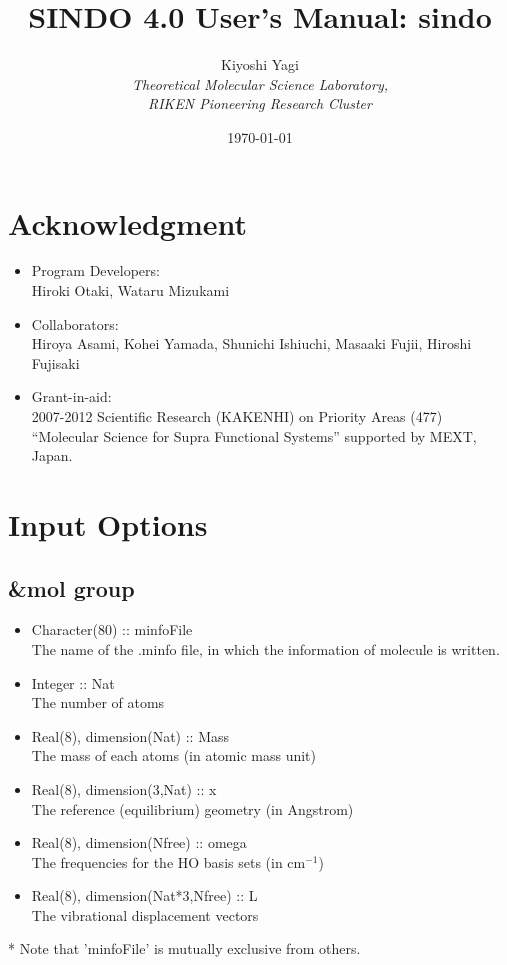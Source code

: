 \documentclass[a4paper,12pt]{article}
\title{{\huge S{\LARGE INDO} 4.0 User's Manual: sindo} }
\author{Kiyoshi Yagi \\ {\it Theoretical Molecular Science Laboratory,} \\ {\it RIKEN Pioneering Research Cluster}}
\date{\today}
\begin{document}
\maketitle

\newpage
\tableofcontents

\newpage

\section*{Acknowledgment}

\begin{itemize}
  \item Program Developers: \\
	Hiroki Otaki, Wataru Mizukami

  \item Collaborators: \\
	Hiroya Asami, Kohei Yamada, Shunichi Ishiuchi, Masaaki Fujii, Hiroshi Fujisaki

  \item Grant-in-aid: \\
	2007-2012 Scientific Research (KAKENHI) on Priority Areas (477)  ``Molecular Science for Supra Functional Systems'' supported by MEXT, Japan.	
  
\end{itemize}

\newpage

\section{Input Options}
\subsection{\&mol group}
   \begin{itemize}
     \item Character(80) :: minfoFile \\
       The name of the .minfo file, in which the information of molecule is written.
     \item Integer :: Nat \\
       The number of atoms
     \item Real(8), dimension(Nat) :: Mass \\
       The mass of each atoms (in atomic mass unit)
     \item Real(8), dimension(3,Nat) :: x \\
       The reference (equilibrium) geometry (in Angstrom)
     \item Real(8), dimension(Nfree) :: omega \\
       The frequencies for the HO basis sets (in $\mathrm{cm^{-1}}$) 
     \item Real(8), dimension(Nat*3,Nfree) :: L \\
       The vibrational displacement vectors 
   \end{itemize}
* Note that 'minfoFile' is mutually exclusive from others. 
\end{document}
